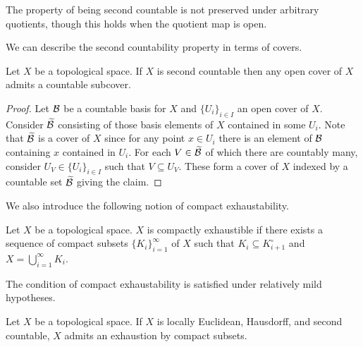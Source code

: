 \begin{remark}
    The property of being second countable is not preserved under arbitrary quotients, though this holds when the quotient map is open. 
\end{remark}
We can describe the second countability property in terms of covers. 
\begin{proposition}\label{prop: second countability via covers}
    Let $X$ be a topological space. If $X$ is second countable then any open cover of $X$ admits a countable subcover. 
\end{proposition}
\begin{proof}
    Let $\mathcal{B}$ be a countable basis for $X$ and $\{U_{i}\}_{i\in I}$ an open cover of $X$. Consider $\widetilde{\mathcal{B}}$ consisting of those basis elements of $X$ contained in some $U_{i}$. Note that $\widetilde{\mathcal{B}}$ is a cover of $X$ since for any point $x\in U_{i}$ there is an element of $\mathcal{B}$ containing $x$ contained in $U_{i}$. For each $V\in\widetilde{\mathcal{B}}$ of which there are countably many, consider $U_{V}\in\{U_{i}\}_{i\in I}$ such that $V\subseteq U_{V}$. These form a cover of $X$ indexed by a countable set $\widetilde{\mathcal{B}}$ giving the claim. 
\end{proof}
We also introduce the following notion of compact exhaustability. 
\begin{definition}\label{def: compact exhaustability}
    Let $X$ be a topological space. $X$ is compactly exhaustible if there exists a sequence of compact subsets $\{K_{i}\}_{i=1}^{\infty}$ of $X$ such that $K_{i}\subseteq K_{i+1}^{\circ}$ and $X=\bigcup_{i=1}^{\infty}K_{i}$.
\end{definition}
The condition of compact exhaustability is satisfied under relatively mild hypotheses. 
\begin{proposition}\label{prop: locally euclidean Hausdorff second countable implies compactly exhaustible}
    Let $X$ be a topological space. If $X$ is locally Euclidean, Hausdorff, and second countable, $X$ admits an exhaustion by compact subsets. 
\end{proposition}
